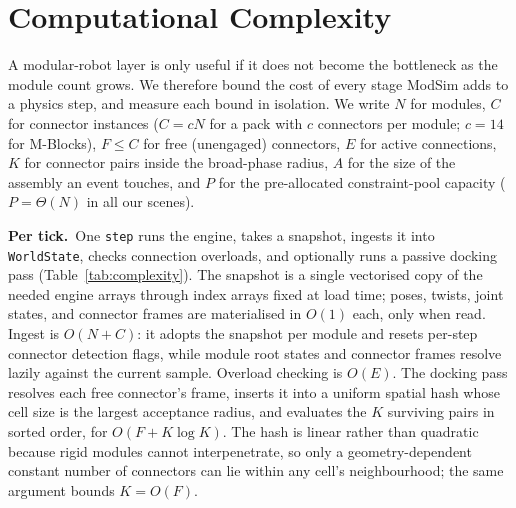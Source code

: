 %
%

\section{Computational Complexity}
\label{sec:complexity}

A modular-robot layer is only useful if it does not become the bottleneck as
the module count grows. We therefore bound the cost of every stage ModSim adds
to a physics step, and measure each bound in isolation.
We write $N$ for modules, $C$ for connector instances ($C=cN$ for a pack with
$c$ connectors per module; $c=14$ for M-Blocks), $F\le C$ for free
(unengaged) connectors, $E$ for active connections, $K$ for connector pairs
inside the broad-phase radius, $A$ for the size of the assembly an event touches,
and $P$ for the pre-allocated constraint-pool capacity ($P=\Theta(N)$ in all our
scenes).

\noindent\textbf{Per tick.}\ One \texttt{step} runs the engine, takes a
snapshot, ingests it into \texttt{WorldState}, checks connection overloads, and
optionally runs a passive docking pass (Table~\ref{tab:complexity}). The
snapshot is a single vectorised copy of the needed engine arrays through index
arrays fixed at load time; poses, twists, joint states, and connector frames are
materialised in $O(1)$ each, only when read. Ingest is $O(N+C)$: it adopts the
snapshot per module and resets per-step connector detection flags, while module
root states and connector frames resolve lazily against the current sample.
Overload checking is $O(E)$. The docking pass resolves each free connector's
frame, inserts it into a uniform spatial hash whose cell size is the largest
acceptance radius, and evaluates the $K$ surviving pairs in sorted order, for
$O(F + K\log K)$. The hash is linear rather than quadratic because rigid modules
cannot interpenetrate, so only a geometry-dependent constant number of
connectors can lie within any cell's neighbourhood; the same argument bounds
$K=O(F)$.


